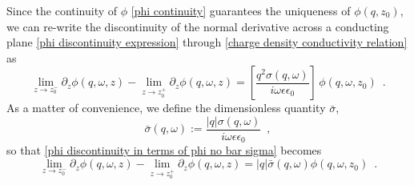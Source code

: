 \documentclass{article}
\newcommand{\lb}{\left[}
\newcommand{\rb}{\right]}
\newcommand{\e}{\epsilon}
\begin{document}
Since the continuity of $\phi$ \eqref{phi continuity} guarantees the uniqueness of $\phi(q,z_0)$, we can re-write the discontinuity of the normal derivative across a conducting plane \eqref{phi discontinuity expression} through \eqref{charge density conductivity relation} as
\begin{equation}
    \label{phi discontinuity in terms of phi no bar sigma}
    \lim_{z\to z_0^-}\partial_z\phi(q,\omega,z) - \lim_{z\to z_0^+}\partial_z\phi(q,\omega,z) = \lb\frac{q^2\sigma(q,\omega)}{i\omega\e\e_0}\rb\,\phi(q,\omega,z_0)
    \,\,\,.
\end{equation}
As a matter of convenience, we define the dimensionless quantity $\bar\sigma$,
\begin{equation}
    \label{bar sigma def}
    \bar\sigma(q,\omega):=
    \frac{|q|\sigma(q,\omega)}{i\omega\e\e_0}
    \,\,\,,
\end{equation}
so that \eqref{phi discontinuity in terms of phi no bar sigma} becomes
\begin{equation}
    \label{phi discontinuity in terms of phi}
    \lim_{z\to z_0^-}\partial_z\phi(q,\omega,z) - \lim_{z\to z_0^+}\partial_z\phi(q,\omega,z) = |q|\bar\sigma(q,\omega)\phi(q,\omega,z_0)
    \,\,\,.
\end{equation}
\end{document}
